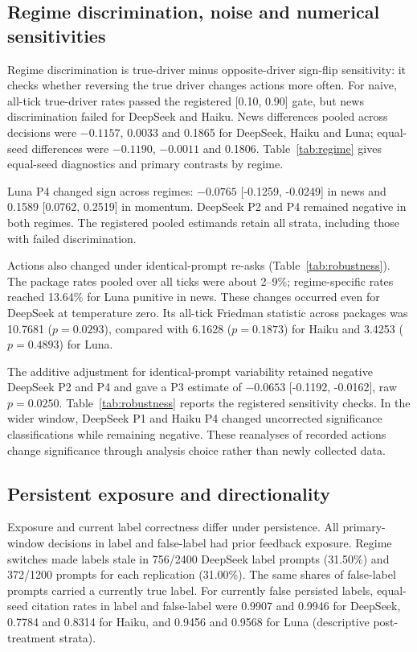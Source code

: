 \documentclass[futureinternet,article,submit,moreauthors,pdftex]{Definitions/mdpi}
\begin{document}
\subsection{Regime discrimination, noise and numerical sensitivities}\label{sec:validity}
Regime discrimination is true-driver minus opposite-driver sign-flip sensitivity: it checks whether reversing the true driver changes actions more often. For naive, all-tick true-driver rates passed the registered [0.10, 0.90] gate, but news discrimination failed for DeepSeek and Haiku. News differences pooled across decisions were $-0.1157$, 0.0033 and 0.1865 for DeepSeek, Haiku and Luna; equal-seed differences were $-0.1190$, $-0.0011$ and 0.1806. Table~\ref{tab:regime} gives equal-seed diagnostics and primary contrasts by regime.

Luna P4 changed sign across regimes: $-0.0765$ [-0.1259, -0.0249] in news and 0.1589 [0.0762, 0.2519] in momentum. DeepSeek P2 and P4 remained negative in both regimes. The registered pooled estimands retain all strata, including those with failed discrimination.


Actions also changed under identical-prompt re-asks (Table~\ref{tab:robustness}). The package rates pooled over all ticks were about 2--9\%; regime-specific rates reached 13.64\% for Luna punitive in news. These changes occurred even for DeepSeek at temperature zero. Its all-tick Friedman statistic across packages was 10.7681 ($p=0.0293$), compared with 6.1628 ($p=0.1873$) for Haiku and 3.4253 ($p=0.4893$) for Luna.

The additive adjustment for identical-prompt variability retained negative DeepSeek P2 and P4 and gave a P3 estimate of $-0.0653$ [-0.1192, -0.0162], raw $p=0.0250$. Table~\ref{tab:robustness} reports the registered sensitivity checks. In the wider window, DeepSeek P1 and Haiku P4 changed uncorrected significance classifications while remaining negative. These reanalyses of recorded actions change significance through analysis choice rather than newly collected data.

\subsection{Persistent exposure and directionality}\label{sec:exposure}
Exposure and current label correctness differ under persistence. All primary-window decisions in label and false-label had prior feedback exposure. Regime switches made labels stale in 756/2400 DeepSeek label prompts (31.50\%) and 372/1200 prompts for each replication (31.00\%). The same shares of false-label prompts carried a currently true label. For currently false persisted labels, equal-seed citation rates in label and false-label were 0.9907 and 0.9946 for DeepSeek, 0.7784 and 0.8314 for Haiku, and 0.9456 and 0.9568 for Luna (descriptive post-treatment strata).
\end{document}
